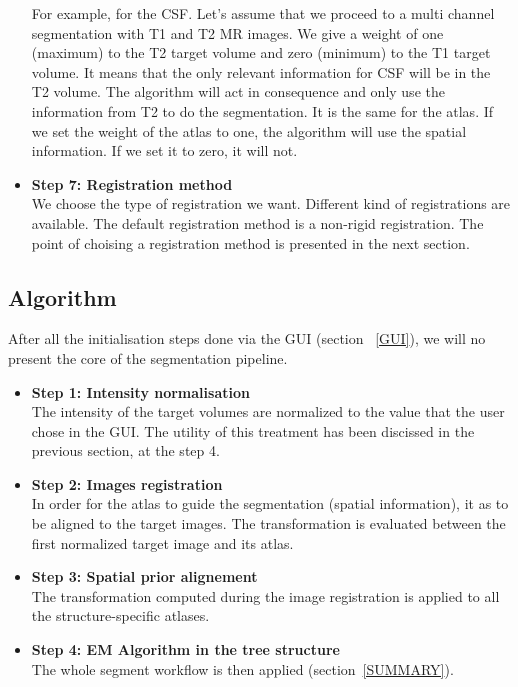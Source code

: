 \begin{itemize}
\par
\hspace*{4 mm}For example, for the CSF. Let's assume that we proceed to a multi channel segmentation with T1 and T2 MR images. We give a weight of one (maximum) to the T2 target volume and zero (minimum) to the T1 target volume. It means that the only relevant information for CSF will be in the T2 volume. The algorithm will act in consequence and only use the information from T2 to do the segmentation. It is the same for the atlas. If we set the weight of the atlas to one, the algorithm will use the spatial information. If we set it to zero, it will not.
%
\item \textbf{Step 7: Registration method}\\
\hspace*{4 mm}We choose the type of registration we want. Different kind of registrations are available. The default registration method is a non-rigid registration. The point of choising a registration method is presented in the next section.
\end{itemize}
%
\subsection{Algorithm}
After all the initialisation steps done via the GUI (section ~\ref{GUI}), we will no present the core of the segmentation pipeline.
%
\begin{itemize}
\item \textbf{Step 1: Intensity normalisation}\\
\hspace*{4 mm}The intensity of the target volumes are normalized to the value that the user chose in the GUI. The utility of this treatment has been discissed in the previous section, at the step 4.
%
\item \textbf{Step 2: Images registration}\\
\hspace*{4 mm}In order for the atlas to guide the segmentation (spatial information), it as to be aligned to the target images. The transformation is evaluated between the first normalized target image and its atlas.
%
\item \textbf{Step 3: Spatial prior alignement}\\
\hspace*{4 mm}The transformation computed during the image registration is applied to all the structure-specific atlases. 
%
\item \textbf{Step 4: EM Algorithm in the tree structure}\\
\hspace*{4 mm}The whole segment workflow is then applied (section~\ref{SUMMARY}).

\end{itemize}
%
